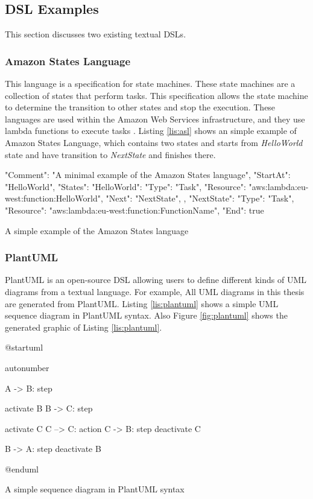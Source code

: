\subsection{DSL Examples}
This section discusses two existing textual DSLs.

\subsubsection{Amazon States Language}
This language is a specification for state machines. These state machines are a collection of states that perform tasks. This specification allows the state machine to determine the transition to other states and stop the execution. These languages are used within the Amazon Web Services infrastructure, and they use lambda functions to execute tasks \cite{amazonwebservices}. Listing \ref{lis:asl} shows an simple example of Amazon States Language, which contains two states and starts from \textit{HelloWorld} state and have transition to \textit{NextState} and finishes there.

\FloatBarrier
\begin{code}
\begin{json}
{
    "Comment": "A minimal example of the Amazon States language",
    "StartAt": "HelloWorld",
    "States": {
        "HelloWorld": {
          "Type": "Task",
          "Resource": "aws:lambda:eu-west:function:HelloWorld",
          "Next": "NextState",
        },
        "NextState": {
          "Type": "Task",
          "Resource": "aws:lambda:eu-west:function:FunctionName",
          "End": true
        }        
    }
}
\end{json}
\caption{A simple example of the Amazon States language \cite{amazonstate}}
\label{lis:asl}
\end{code}
\FloatBarrier

\subsubsection{PlantUML}
PlantUML is an open-source DSL allowing users to define different kinds of UML diagrams from a textual language. For example, All UML diagrams in this thesis are generated from PlantUML.
Listing \ref{lis:plantuml} shows a simple UML sequence diagram in PlantUML syntax. Also Figure \ref{fig:plantuml} shows the generated graphic of Listing \ref{lis:plantuml}.

\FloatBarrier
\begin{code}
\begin{js2}
@startuml

autonumber

A -> B: step

activate B
B -> C: step

activate C
C --> C: action
C -> B: step
deactivate C

B -> A: step
deactivate B

@enduml
\end{js2}
\caption{A simple sequence diagram in PlantUML syntax}
\label{lis:plantuml}
\end{code}
\FloatBarrier


